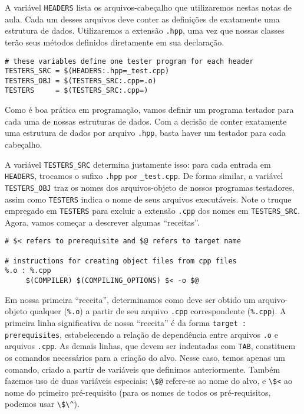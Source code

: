 \documentclass[11pt]{article}
\begin{document}
A variável \texttt{HEADERS} lista os arquivos-cabeçalho que
utilizaremos nestas notas de aula.  Cada um desses arquivos deve
conter as definições de exatamente uma estrutura de dados.
Utilizaremos a extensão \texttt{.hpp}, uma vez que nossas classes
terão seus métodos definidos diretamente em sua declaração.

\begin{verbatim}
# these variables define one tester program for each header
TESTERS_SRC = $(HEADERS:.hpp=_test.cpp)
TESTERS_OBJ = $(TESTERS_SRC:.cpp=.o)
TESTERS     = $(TESTERS_SRC:.cpp=)
\end{verbatim}

Como é boa prática em programação, vamos definir um programa
testador para cada uma de nossas estruturas de dados.  Com a
decisão de conter exatamente uma estrutura de dados por arquivo
\texttt{.hpp}, basta haver um testador para cada cabeçalho.

A variável \texttt{TESTERS\_SRC} determina justamente isso: para
cada entrada em \texttt{HEADERS}, trocamos o sufixo \texttt{.hpp}
por \texttt{\_test.cpp}.  De forma similar, a variável
\texttt{TESTERS\_OBJ} traz os nomes dos arquivos-objeto de nossos
programas testadores, assim como \texttt{TESTERS} indica o nome de
seus arquivos executáveis.  Note o truque empregado em
\texttt{TESTERS} para excluir a extensão \texttt{.cpp} dos nomes em
\texttt{TESTERS\_SRC}.  Agora, vamos começar a descrever algumas
``receitas''.

\begin{verbatim}
# $< refers to prerequisite and $@ refers to target name

# instructions for creating object files from cpp files
%.o : %.cpp
     $(COMPILER) $(COMPILING_OPTIONS) $< -o $@
\end{verbatim}

Em nossa primeira ``receita'', determinamos como deve ser obtido um
arquivo-objeto qualquer (\texttt{\%.o}) a partir de seu arquivo
\texttt{.cpp} correspondente (\texttt{\%.cpp}).  A primeira linha
significativa de nossa ``receita'' é da forma
\texttt{target : prerequisites}, estabelecendo a relação de
dependência entre arquivos \texttt{.o} e arquivos \texttt{.cpp}.
As demais linhas, que devem ser indentadas com \texttt{TAB},
constituem os comandos necessários para a criação do alvo.  Nesse
caso, temos apenas um comando, criado a partir de variáveis que
definimos anteriormente. Também fazemos uso de duas variáveis
especiais: \texttt{\textbackslash{}\$@} refere-se ao nome do alvo, e \texttt{\textbackslash{}\$<}
ao nome do primeiro pré-requisito (para os nomes de todos os
pré-requisitos, podemos usar \texttt{\textbackslash{}\$\textbackslash{}\textasciicircum{}}).
\end{document}
